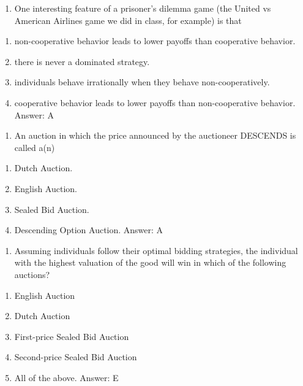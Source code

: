 \documentclass[11pt,]{article}
\providecommand{\tightlist}{%
  \setlength{\itemsep}{0pt}\setlength{\parskip}{0pt}}
\begin{document}
\begin{enumerate}
\def\labelenumi{\arabic{enumi})}
\setcounter{enumi}{17}
\tightlist
\item
  One interesting feature of a prisoner's dilemma game (the United vs
  American Airlines game we did in class, for example) is that
\end{enumerate}

\begin{enumerate}
\def\labelenumi{\Alph{enumi})}
\tightlist
\item
  non-cooperative behavior leads to lower payoffs than cooperative
  behavior.
\item
  there is never a dominated strategy.
\item
  individuals behave irrationally when they behave non-cooperatively.
\item
  cooperative behavior leads to lower payoffs than non-cooperative
  behavior. Answer: A
\end{enumerate}

\begin{enumerate}
\def\labelenumi{\arabic{enumi})}
\setcounter{enumi}{18}
\tightlist
\item
  An auction in which the price announced by the auctioneer DESCENDS is
  called a(n)
\end{enumerate}

\begin{enumerate}
\def\labelenumi{\Alph{enumi})}
\tightlist
\item
  Dutch Auction.
\item
  English Auction.
\item
  Sealed Bid Auction.
\item
  Descending Option Auction. Answer: A
\end{enumerate}

\begin{enumerate}
\def\labelenumi{\arabic{enumi})}
\setcounter{enumi}{19}
\tightlist
\item
  Assuming individuals follow their optimal bidding strategies, the
  individual with the highest valuation of the good will win in which of
  the following auctions?
\end{enumerate}

\begin{enumerate}
\def\labelenumi{\Alph{enumi})}
\tightlist
\item
  English Auction
\item
  Dutch Auction
\item
  First-price Sealed Bid Auction
\item
  Second-price Sealed Bid Auction
\item
  All of the above. Answer: E
\end{enumerate}
\end{document}
